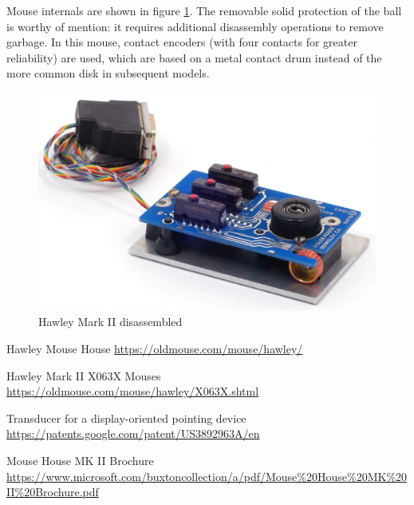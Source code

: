 \documentclass[11pt, a4paper]{article}
\begin{document}
Mouse internals are shown in figure \ref{fig:HawleyMarkIIInside}. The removable solid protection of the ball is worthy of mention: it requires additional disassembly operations to remove garbage. In this mouse, contact encoders (with four contacts for greater reliability) are used, which are based on a metal contact drum instead of the more common disk in subsequent models.

 \begin{figure}[h]
    \centering
    \includegraphics[scale=0.8]{1983_hawley_mark_ii/inside_60.jpg}
    \caption{Hawley Mark II disassembled}
    \label{fig:HawleyMarkIIInside}
\end{figure}

\begin{thebibliography}{9}
 Hawley Mouse House \url{https://oldmouse.com/mouse/hawley/}

 Hawley Mark II X063X Mouses \url{https://oldmouse.com/mouse/hawley/X063X.shtml}

 Transducer for a display-oriented pointing device \url{https://patents.google.com/patent/US3892963A/en}

 Mouse House MK II Brochure \url{https://www.microsoft.com/buxtoncollection/a/pdf/Mouse%20House%20MK%20II%20Brochure.pdf}
\end{thebibliography}
\end{document}

